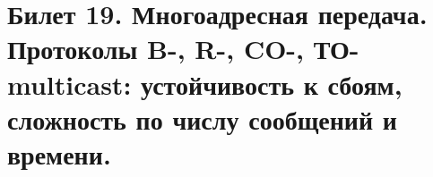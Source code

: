 \newpage
\section {Билет 19. Многоадресная передача. Протоколы B-, R-, CO-, ТО-multicast: устойчивость к сбоям, сложность по числу сообщений и времени.}